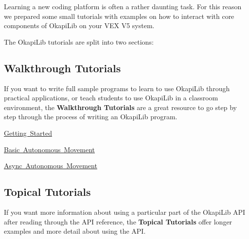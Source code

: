 Learning a new coding platform is often a rather daunting task. For this reason we prepared some small tutorials with examples on how to interact with core components of Okapi\+Lib on your V\+EX V5 system.

The Okapi\+Lib tutorials are split into two sections\+:

\subsection*{Walkthrough Tutorials}

If you want to write full sample programs to learn to use Okapi\+Lib through practical applications, or teach students to use Okapi\+Lib in a classroom environment, the {\bfseries{Walkthrough Tutorials}} are a great resource to go step by step through the process of writing an Okapi\+Lib program.


\begin{DoxyItemize}
\item \mbox{\hyperlink{md_docs_tutorials_walkthrough_gettingStarted}{Getting Started}}
\item \mbox{\hyperlink{md_docs_tutorials_walkthrough_basicAutonomousMovement}{Basic Autonomous Movement}}
\item \mbox{\hyperlink{md_docs_tutorials_walkthrough_asyncAutonomousMovement}{Async Autonomous Movement}}
\end{DoxyItemize}

\subsection*{Topical Tutorials}

If you want more information about using a particular part of the Okapi\+Lib A\+PI after reading through the A\+PI reference, the {\bfseries{Topical Tutorials}} offer longer examples and more detail about using the A\+PI. 